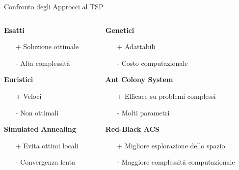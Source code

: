 \documentclass{beamer}
\begin{document}
\begin{frame}{Confronto degli Approcci al TSP}
    \small
    \begin{columns}[T,totalwidth=\textwidth]
        \begin{column}{0.5\textwidth}
            \textbf{Esatti}
            \begin{itemize}
                \item[+] Soluzione ottimale
                \item[-] Alta complessità
            \end{itemize}

            \textbf{Euristici}
            \begin{itemize}
                \item[+] Veloci
                \item[-] Non ottimali
            \end{itemize}

            \textbf{Simulated Annealing}
            \begin{itemize}
                \item[+] Evita ottimi locali
                \item[-] Convergenza lenta
            \end{itemize}
        \end{column}

        \begin{column}{0.5\textwidth}
            \textbf{Genetici}
            \begin{itemize}
                \item[+] Adattabili
                \item[-] Costo computazionale
            \end{itemize}

            \textbf{Ant Colony System}
            \begin{itemize}
                \item[+] Efficace su problemi complessi
                \item[-] Molti parametri
            \end{itemize}

            \textbf{Red-Black ACS}
            \begin{itemize}
                \item[+] Migliore esplorazione dello spazio
                \item[-] Maggiore complessità computazionale
            \end{itemize}
        \end{column}
    \end{columns}
\end{frame}
\end{document}
